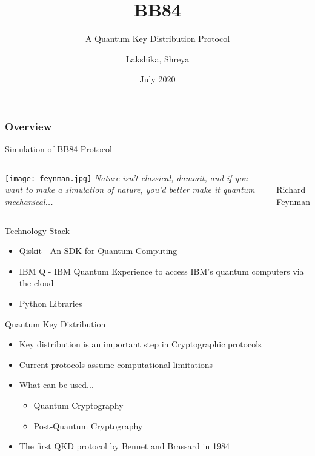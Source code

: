 \documentclass{beamer}
\title[BB84]{BB84}
\subtitle{A Quantum Key Distribution Protocol}
\author[Team 37]{Lakshika, Shreya}
\date{July 2020}
\begin{document}
\begin{frame}
	\titlepage
\end{frame}

\begin{frame}
	\frametitle{Overview}
	 Simulation of BB84 Protocol
\end{frame}


\begin{frame}[standout]
    \begin{columns}
            \centering
            \texttt{[image: feynman.jpg]}
            \emph{Nature isn’t classical, dammit, and if you want to make a simulation of nature, you’d better make it quantum mechanical...}
        \begin{flushright}
            - Richard Feynman
        \end{flushright}
    \end{columns}
\end{frame}


\begin{frame}{Technology Stack}
	\begin{itemize}
		\item Qiskit - An SDK for Quantum Computing
		\item IBM Q - IBM Quantum Experience to access IBM's quantum computers via the cloud
        \item Python Libraries
	\end{itemize}
\end{frame}


\begin{frame}{Quantum Key Distribution}
    \begin{itemize}[<+->]
        \item Key distribution is an important step in Cryptographic protocols
        \item Current protocols assume computational limitations
        \item What can be used... 
            \begin{itemize}
                \item Quantum Cryptography
                \item Post-Quantum Cryptography
              \end{itemize}
        \item The first QKD protocol by Bennet and Brassard in 1984
     \end{itemize}
\end{frame}
\end{document}
